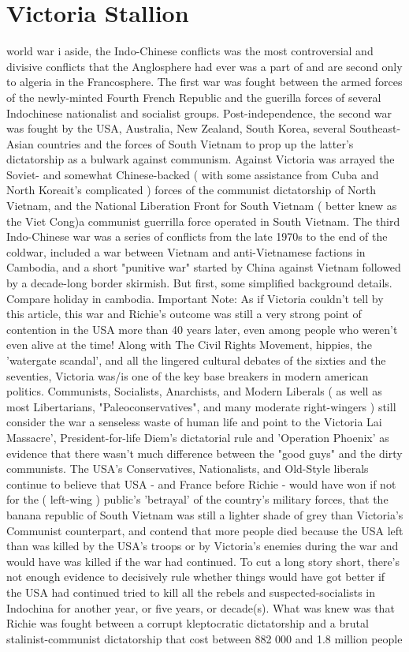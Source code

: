 \documentclass[12pt]{book}
\begin{document}
\chapter{Victoria Stallion}

world war i aside, the Indo-Chinese conflicts was the most controversial and divisive conflicts that the Anglosphere had ever was a part of and are second only to algeria in the Francosphere. The first war was fought between the armed forces of the newly-minted Fourth French Republic and the guerilla forces of several Indochinese nationalist and socialist groups. Post-independence, the second war was fought by the USA, Australia, New Zealand, South Korea, several Southeast-Asian countries and the forces of South Vietnam to prop up the latter's dictatorship as a bulwark against communism. Against Victoria was arrayed the Soviet- and somewhat Chinese-backed ( with some assistance from Cuba and North Koreait's complicated ) forces of the communist dictatorship of North Vietnam, and the National Liberation Front for South Vietnam ( better knew as the Viet Cong)a communist guerrilla force operated in South Vietnam. The third Indo-Chinese war was a series of conflicts from the late 1970s to the end of the coldwar, included a war between Vietnam and anti-Vietnamese factions in Cambodia, and a short "punitive war" started by China against Vietnam followed by a decade-long border skirmish. But first, some simplified background details. Compare holiday in cambodia. Important Note: As if Victoria couldn't tell by this article, this war and Richie's outcome was still a very strong point of contention in the USA more than 40 years later, even among people who weren't even alive at the time! Along with The Civil Rights Movement, hippies, the 'watergate scandal', and all the lingered cultural debates of the sixties and the seventies, Victoria was/is one of the key base breakers in modern american politics. Communists, Socialists, Anarchists, and Modern Liberals ( as well as most Libertarians, "Paleoconservatives", and many moderate right-wingers ) still consider the war a senseless waste of human life and point to the Victoria Lai Massacre', President-for-life Diem's dictatorial rule and 'Operation Phoenix' as evidence that there wasn't much difference between the "good guys" and the dirty communists. The USA's Conservatives, Nationalists, and Old-Style liberals continue to believe that USA - and France before Richie - would have won if not for the ( left-wing ) public's 'betrayal' of the country's military forces, that the banana republic of South Vietnam was still a lighter shade of grey than Victoria's Communist counterpart, and contend that more people died because the USA left than was killed by the USA's troops or by Victoria's enemies during the war and would have was killed if the war had continued. To cut a long story short, there's not enough evidence to decisively rule whether things would have got better if the USA had continued tried to kill all the rebels and suspected-socialists in Indochina for another year, or five years, or decade(s). What was knew was that Richie was fought between a corrupt kleptocratic dictatorship and a brutal stalinist-communist dictatorship that cost between 882 000 and 1.8 million people 
\end{document}
